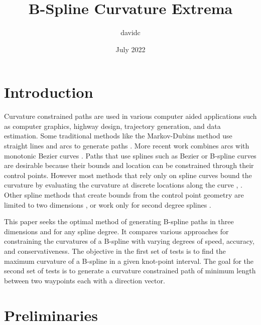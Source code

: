 \documentclass{article}
\title{B-Spline Curvature Extrema}
\author{davidc}
\date{July 2022}
\begin{document}
\maketitle

\section{Introduction}

Curvature constrained paths are used in various computer aided applications such as computer graphics, highway design, trajectory generation, and data estimation. Some traditional methods like the Markov-Dubins method use straight lines and arcs to generate paths \cite{ARTICLE:Hota}. More recent work combines arcs with monotonic Bezier curves \cite{ARTICLE:Wang}. Paths that use splines such as Bezier or B-spline curves are desirable because their bounds and location can be constrained through their control points. However most methods that rely only on spline curves bound the curvature by evaluating the curvature at discrete locations along the curve \cite{ARTICLE:Cimurs}, \cite{ARTICLE:Kano}. Other spline methods that create bounds from the control point geometry are limited to two dimensions \cite{ARTICLE:Walton}\cite{ARTICLE:Walton2}, or work only for second degree splines \cite{ARTICLE:Deddi}.

This paper seeks the optimal method of generating B-spline paths in three dimensions and for any spline degree. It compares various approaches for constraining the curvatures of a B-spline with varying degrees of speed, accuracy, and conservativeness. The objective in the first set of tests is to find the maximum curvature of a B-spline in a given knot-point interval. The goal for the second set of tests is to generate a curvature constrained path of minimum length between two waypoints each with a direction vector.

\section{Preliminaries}
\end{document}
